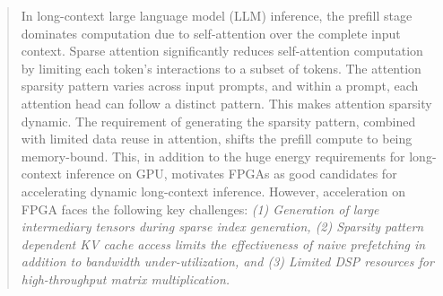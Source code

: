 \documentclass[conference]{IEEEtran}
\begin{document}




\maketitle

\begin{abstract}
In long-context large language model (LLM) inference, the prefill stage dominates computation due to self-attention over the complete input context. Sparse attention significantly reduces self-attention computation by limiting each token’s interactions to a subset of tokens. The attention sparsity pattern varies across input prompts, and within a prompt, each attention head can follow a distinct pattern. This makes attention sparsity dynamic. The requirement of generating the sparsity pattern, combined with limited data reuse in attention, shifts the prefill compute to being memory-bound. 
This, in addition to the huge energy requirements for long-context inference on GPU, motivates FPGAs as good candidates for accelerating dynamic long-context inference. However, acceleration on FPGA faces the following key challenges: \textit{(1) Generation of large intermediary tensors during sparse index generation, (2) Sparsity pattern dependent KV cache access limits the effectiveness of naive prefetching in addition to bandwidth under-utilization, and (3) Limited DSP resources for high-throughput matrix multiplication.}   


\end{abstract}
\end{document}
